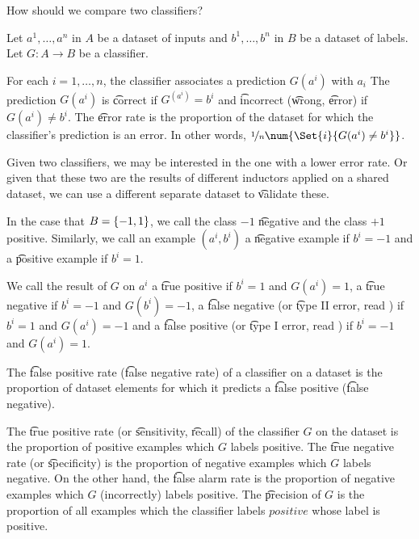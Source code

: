 

How should we compare two classifiers?


Let $a^1, \dots, a^n$ in $A$ be a dataset of inputs and $b^1, \dots, b^n$ in $B$ be a dataset of labels.
Let $G: A \to B$ be a classifier.

For each $i = 1, \dots, n$, the classifier associates a prediction $G(a^i)$ with $a_i$
The prediction $G(a^i)$ is \t{correct} if $G^(a^i) = b^i$ and \t{incorrect} (\t{wrong}, \t{error}) if $G(a^i) \neq b^i$.
The \t{error rate} is the proportion of the dataset for which the classifier's prediction is an error.
In other words, $\nicefrac{1}{n}\num{\Set{i}{G(a^i) \neq b^i}}$.

Given two classifiers, we may be interested in the one with a lower error rate.
Or given that these two are the results of different inductors applied on a shared dataset, we can use a different separate dataset to \t{validate} these.


In the case that $B = \{-1, 1\}$, we call the class $-1$ \t{negative} and the class $+1$ positive.
Similarly, we call an example $(a^i, b^i)$ a \t{negative example} if $b^i = -1$ and a \t{positive example} if $b^i = 1$.

We call the result of $G$ on $a^i$ a \t{true positive} if $b^i = 1$ and $G(a^i) = 1$, a \t{true negative} if $b^i = -1$ and $G(b^i) = -1$, a \t{false negative} (or \t{type II error}, read ) if $b^i = 1$ and $G(a^i) = -1$ and a \t{false positive} (or \t{type I error}, read ) if $b^i = -1$ and $G(a^i) = 1$.

The \t{false positive rate} (\t{false negative rate}) of a classifier on a dataset is the proportion of dataset elements for which it predicts a \t{false positive} (\t{false negative}).

The \t{true positive rate} (or \t{sensitivity}, \t{recall}) of the classifier $G$ on the dataset is the proportion of positive examples which $G$ labels positive.
The \t{true negative rate} (or \t{specificity}) is the proportion of negative examples which $G$ labels negative.
On the other hand, the \t{false alarm rate} is the proportion of negative examples which $G$ (incorrectly) labels positive.
The \t{precision} of $G$ is the proportion of all examples which the classifier labels $positive$ whose label is positive.

\blankpage
